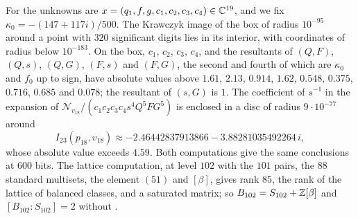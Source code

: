 For  the unknowns are $x=(q_{1},f,g,c_{1},c_{2},c_{3},
c_{4})\in\mathbb{C}^{19}$, and we fix $\kappa_{0}=-(147+117i)/500$. The Krawczyk
image of the box of radius $10^{-95}$ around a point with $320$ significant
digits lies in its interior, with coordinates of radius below $10^{-183}$.
On the box, $c_{1}$, $c_{2}$, $c_{3}$, $c_{4}$, and the resultants of
$(Q,F)$, $(Q,s)$, $(Q,G)$, $(F,s)$ and $(F,G)$, the second and fourth of
which are $\kappa_{0}$ and $f_{0}$ up to sign, have absolute values above
$1.61$, $2.13$, $0.914$, $1.62$, $0.548$, $0.375$, $0.716$, $0.685$ and
$0.078$; the resultant of $(s,G)$ is $1$. The coefficient of $s^{-1}$ in the
expansion of $\mathcal N_{v_{18}}/(c_{1}c_{2}c_{3}c_{4}s^{4}Q^{5}FG^{5})$ is
enclosed in a disc of radius $9\cdot10^{-77}$ around
\[
  I_{23}(p_{18},v_{18})\approx-2.46442837913866-3.88281035492264\,i,
\]
whose absolute value exceeds $4.59$. Both computations give the same
conclusions at $600$ bits. The lattice computation, at level $102$ with the
$101$ pairs, the $88$ standard multisets, the element $(51)$ and $[\beta]$,
gives rank $85$, the rank of the lattice of balanced classes, and a saturated
matrix; so $B_{102}=S_{102}+\mathbb{Z}[\beta]$ and $[B_{102}:S_{102}]=2$ without
.
